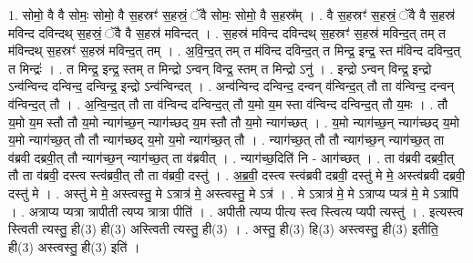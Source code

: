 \documentclass[17pt]{extarticle}
\begin{document}
1. सोमो॒ वै वै सोमः॒ सोमो॒ वै स॒हस्रꣳ॑ स॒हस्रं॒ ॅवै सोमः॒ सोमो॒ वै स॒हस्र᳚म् । . वै स॒हस्रꣳ॑ स॒हस्रं॒ ॅवै वै स॒हस्र॑ मविन्द दविन्दथ् स॒हस्रं॒ ॅवै वै स॒हस्र॑ मविन्दत् । . स॒हस्र॑ मविन्द दविन्दथ् स॒हस्रꣳ॑ स॒हस्र॑ मविन्द॒त् तम् त म॑विन्दथ् स॒हस्रꣳ॑ स॒हस्र॑ मविन्द॒त् तम् । . अ॒वि॒न्द॒त् तम् त म॑विन्द दविन्द॒त् त मिन्द्र॒ इन्द्र॒ स्त म॑विन्द दविन्द॒त् त मिन्द्रः॑ । . त मिन्द्र॒ इन्द्र॒ स्तम् त मिन्द्रो ऽन्वन् विन्द्र॒ स्तम् त मिन्द्रो ऽनु॑ । . इन्द्रो ऽन्वन् विन्द्र॒ इन्द्रो ऽन्व॑न्विन्द दन्विन्द॒ दन्विन्द्र॒ इन्द्रो ऽन्व॑न्विन्दत् । . अन्व॑न्विन्द दन्विन्द॒ दन्वन् व॑न्विन्द॒त् तौ ता व॑न्विन्द॒ दन्वन् व॑न्विन्द॒त् तौ । . अ॒न्वि॒न्द॒त् तौ ता व॑न्विन्द दन्विन्द॒त् तौ य॒मो य॒म स्ता व॑न्विन्द दन्विन्द॒त् तौ य॒मः । . तौ य॒मो य॒म स्तौ तौ य॒मो न्याग॑च्छ॒न् न्याग॑च्छद् य॒म स्तौ तौ य॒मो न्याग॑च्छत् । . य॒मो न्याग॑च्छ॒न् न्याग॑च्छद् य॒मो य॒मो न्याग॑च्छ॒त् तौ तौ न्याग॑च्छद् य॒मो य॒मो न्याग॑च्छ॒त् तौ । . न्याग॑च्छ॒त् तौ तौ न्याग॑च्छ॒न् न्याग॑च्छ॒त् ता व॑ब्रवी दब्रवी॒त् तौ न्याग॑च्छ॒न् न्याग॑च्छ॒त् ता व॑ब्रवीत् । . न्याग॑च्छ॒दिति॑ नि - आग॑च्छत् । . ता व॑ब्रवी दब्रवी॒त् तौ ता व॑ब्रवी॒ दस्त्व स्त्व॑ब्रवी॒त् तौ ता व॑ब्रवी॒ दस्तु॑ । . अ॒ब्र॒वी॒ दस्त्व स्त्व॑ब्रवी दब्रवी॒ दस्तु॑ मे मे॒ अस्त्व॑ब्रवी दब्रवी॒ दस्तु॑ मे । . अस्तु॑ मे मे॒ अस्त्वस्तु॒ मे ऽत्रात्र॑ मे॒ अस्त्वस्तु॒ मे ऽत्र॑ । . मे ऽत्रात्र॑ मे॒ मे ऽत्राप्य प्यत्र॑ मे॒ मे ऽत्रापि॑ । . अत्राप्य प्यत्रा त्रापीती त्यप्य त्रात्रा पीति॑ । . अपीती त्यप्य पीत्य स्त्व स्त्वित्य प्यपी त्यस्तु॑ । . इत्यस्त्व स्त्विती त्यस्तु॒ ही(3) ही(3) अस्त्विती त्यस्तु॒ ही(3) । . अस्तु॒ ही(3) हि(3) अस्त्वस्तु॒ ही(3) इतीति॒ ही(3) अस्त्वस्तु॒ ही(3) इति॑ । \newline
\end{document}
